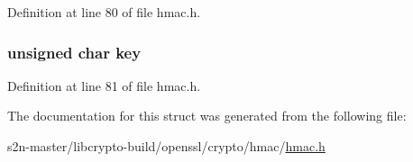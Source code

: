 Definition at line 80 of file hmac.\+h.

\subsubsection[{\texorpdfstring{key}{key}}]{\setlength{\rightskip}{0pt plus 5cm}unsigned char key}\hypertarget{structhmac__ctx__st_afdf91bfbe92eb0b23ae37bb94e1472a0}{}\label{structhmac__ctx__st_afdf91bfbe92eb0b23ae37bb94e1472a0}


Definition at line 81 of file hmac.\+h.



The documentation for this struct was generated from the following file\+:\begin{DoxyCompactItemize}
\item 
s2n-\/master/libcrypto-\/build/openssl/crypto/hmac/\hyperlink{crypto_2hmac_2hmac_8h}{hmac.\+h}\end{DoxyCompactItemize}

